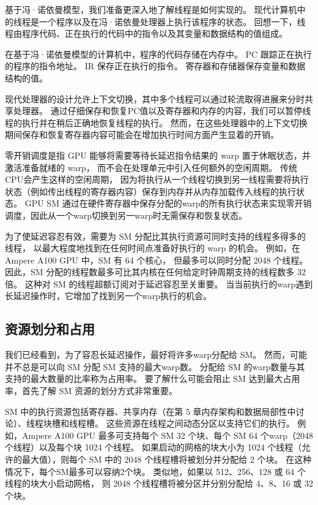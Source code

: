 \begin{remark}[线程、上下文切换和零开销调度]
基于冯·诺依曼模型，我们准备更深入地了解线程是如何实现的。 
现代计算机中的线程是一个程序以及在冯·诺依曼处理器上执行该程序的状态。 
回想一下，线程由程序代码、正在执行的代码中的指令以及其变量和数据结构的值组成。

在基于冯·诺依曼模型的计算机中，程序的代码存储在内存中。 PC 跟踪正在执行的程序的指令地址。 
IR 保存正在执行的指令。 寄存器和存储器保存变量和数据结构的值。

现代处理器的设计允许上下文切换，其中多个线程可以通过轮流取得进展来分时共享处理器。 
通过仔细保存和恢复PC值以及寄存器和内存的内容，我们可以暂停线程的执行并在稍后正确地恢复线程的执行。 
然而，在这些处理器中的上下文切换期间保存和恢复寄存器内容可能会在增加执行时间方面产生显着的开销。

零开销调度是指 GPU 能够将需要等待长延迟指令结果的 warp 置于休眠状态，并激活准备就绪的 warp，
而不会在处理单元中引入任何额外的空闲周期。 传统CPU会产生这样的空闲周期，
因为将执行从一个线程切换到另一线程需要将执行状态（例如传出线程的寄存器内容）保存到内存并从内存加载传入线程的执行状态。 
GPU SM 通过在硬件寄存器中保存分配的warp的所有执行状态来实现零开销调度，因此从一个warp切换到另一warp时无需保存和恢复状态。
\end{remark}

为了使延迟容忍有效，需要为 SM 分配比其执行资源可同时支持的线程多得多的线程，
以最大程度地找到在任何时间点准备好执行的 warp 的机会。 例如，在 Ampere A100 GPU 中，SM 有 64 个核心，
但最多可以同时分配 2048 个线程。 因此，SM 分配的线程数最多可比其内核在任何给定时钟周期支持的线程数多 32 倍。 
这种对 SM 的线程超额订阅对于延迟容忍至关重要。 当当前执行的warp遇到长延迟操作时，它增加了找到另一个warp执行的机会。

\subsection{资源划分和占用}
我们已经看到，为了容忍长延迟操作，最好将许多warp分配给 SM。 然而，可能并不总是可以向 SM 分配 SM 支持的最大warp数。 
分配给 SM 的warp数量与其支持的最大数量的比率称为占用率。 
要了解什么可能会阻止 SM 达到最大占用率，首先了解 SM 资源的划分方式非常重要。

SM 中的执行资源包括寄存器、共享内存（在第 5 章内存架构和数据局部性中讨论）、线程块槽和线程槽。 
这些资源在线程之间动态分区以支持它们的执行。 
例如，Ampere A100 GPU 最多可支持每个 SM 32 个块、每个 SM 64 个warp（2048 个线程）以及每个块 1024 个线程。 
如果启动的网格的块大小为 1024 个线程（允许的最大值），则每个 SM 中的 2048 个线程槽将被划分并分配给 2 个块。 
在这种情况下，每个SM最多可以容纳2个块。 类似地，如果以 512、256、128 或 64 个线程的块大小启动网格，
则 2048 个线程槽将被分区并分别分配给 4、8、16 或 32 个块。

